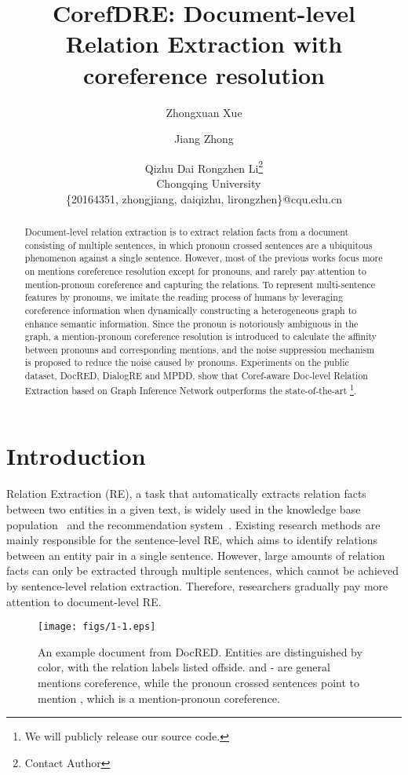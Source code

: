 \documentclass{article}
\title{CorefDRE: Document-level Relation Extraction with coreference resolution}
\author{
Zhongxuan Xue\and
Jiang Zhong\and
Qizhu Dai\And
Rongzhen Li\footnote{Contact Author}\\\
\affiliations
Chongqing University\\
\emails
\{20164351, zhongjiang, daiqizhu, lirongzhen\}@cqu.edu.cn
}
\begin{document}
\maketitle

\begin{abstract}
Document-level relation extraction is to extract relation facts from a document consisting of multiple sentences, in which pronoun crossed sentences are a ubiquitous phenomenon against a single sentence. However, most of the previous works focus more on mentions coreference resolution except for pronouns, and rarely pay attention to mention-pronoun coreference and capturing the relations. To represent multi-sentence features by pronouns, we imitate the reading process of humans by leveraging coreference information when dynamically constructing a heterogeneous graph to enhance semantic information. Since the pronoun is notoriously ambiguous in the graph, a mention-pronoun coreference resolution is introduced to calculate the affinity between pronouns and corresponding mentions, and the noise suppression mechanism is proposed to reduce the noise caused by pronouns. Experiments on the public dataset, DocRED, DialogRE and MPDD, show that Coref-aware Doc-level Relation Extraction based on Graph Inference Network outperforms the state-of-the-art \footnote{We will publicly release our source code.}.
\end{abstract}
\section{Introduction}

Relation Extraction (RE), a task that automatically extracts relation facts between two entities in a given text, is widely used in the knowledge base population~\cite{zhang2017position} and the recommendation system~\cite{zhang2021causerec}. Existing research methods are mainly  responsible for the sentence-level RE, which aims to identify relations between an entity pair in a single sentence. However, large amounts of relation facts can only be extracted through multiple sentences, which cannot be achieved by sentence-level relation extraction. Therefore, researchers gradually pay more attention to document-level RE.

\begin{figure}[ht]
    \centering
    \setlength{\abovecaptionskip}{0cm}
\setlength{\belowcaptionskip}{-0.4cm}
    \texttt{[image: figs/1-1.eps]}
    \caption{An example document from DocRED. Entities are distinguished by color, with the relation labels listed offside.    and - are general mentions coreference, while the pronoun crossed sentences  point to mention   , which is a mention-pronoun coreference.}
    \label{fig1}
\end{figure}
\end{document}
